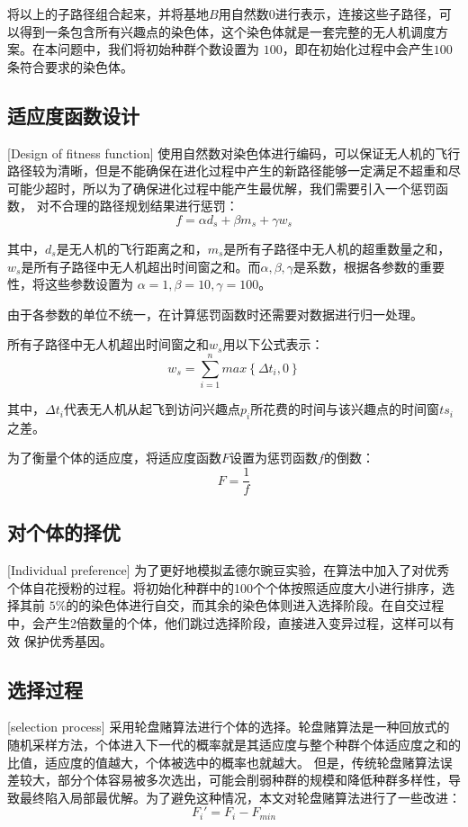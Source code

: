 将以上的子路径组合起来，并将基地$B$用自然数$0$进行表示，连接这些子路径，可以得到一条包含所有兴趣点的染色体，这个染色体就是一套完整的无人机调度方案。在本问题中，我们将初始种群个数设置为
$100$，即在初始化过程中会产生$100$条符合要求的染色体。

\subsection{适应度函数设计}[Design of fitness function]
使用自然数对染色体进行编码，可以保证无人机的飞行路径较为清晰，但是不能确保在进化过程中产生的新路径能够一定满足不超重和尽可能少超时，所以为了确保进化过程中能产生最优解，我们需要引入一个惩罚函数，
对不合理的路径规划结果进行惩罚：
$$ f= \alpha d_s + \beta m_s + \gamma w_s $$


其中，$d_s$是无人机的飞行距离之和，$m_s$是所有子路径中无人机的超重数量之和，$w_s$是所有子路径中无人机超出时间窗之和。而$\alpha,\beta,\gamma$是系数，根据各参数的重要性，将这些参数设置为
$\alpha = 1,\beta = 10,\gamma = 100$。


由于各参数的单位不统一，在计算惩罚函数时还需要对数据进行归一处理。


所有子路径中无人机超出时间窗之和$w_s$用以下公式表示：
$$ w_s = \sum_{i=1}^n max\left\{\Delta t_i,0\right\}$$


其中，$\Delta t_i$代表无人机从起飞到访问兴趣点$p_i$所花费的时间与该兴趣点的时间窗$ts_i$之差。


为了衡量个体的适应度，将适应度函数$F$设置为惩罚函数$f$的倒数：
$$ F = \frac{1}{f}$$

\subsection{对个体的择优}[Individual preference]
为了更好地模拟孟德尔豌豆实验，在算法中加入了对优秀个体自花授粉的过程。将初始化种群中的100个个体按照适应度大小进行排序，选择其前
$5\%$的的染色体进行自交，而其余的染色体则进入选择阶段。在自交过程中，会产生2倍数量的个体，他们跳过选择阶段，直接进入变异过程，这样可以有效
保护优秀基因。

\subsection{选择过程}[selection process]
采用轮盘赌算法进行个体的选择。轮盘赌算法是一种回放式的随机采样方法，个体进入下一代的概率就是其适应度与整个种群个体适应度之和的比值，适应度的值越大，个体被选中的概率也就越大。
但是，传统轮盘赌算法误差较大，部分个体容易被多次选出，可能会削弱种群的规模和降低种群多样性，导致最终陷入局部最优解。为了避免这种情况，本文对轮盘赌算法进行了一些改进：
$$ F_i' = F_i - F_{min} $$


